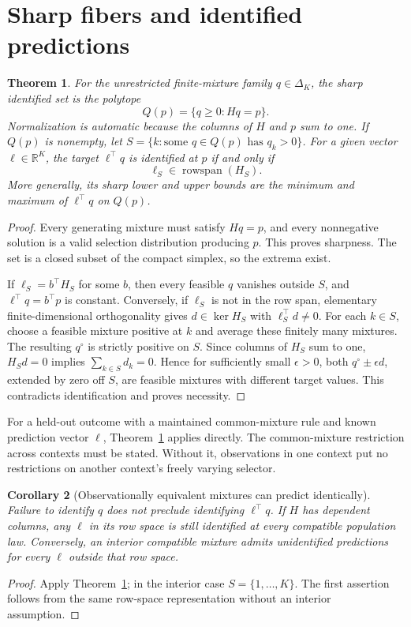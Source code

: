 \documentclass[11pt]{article}
\newtheorem{theorem}{Theorem}
\newtheorem{corollary}[theorem]{Corollary}
\theoremstyle{remark}
\newcommand{\R}{\mathbb R}
\begin{document}
\section{Sharp fibers and identified predictions}
\begin{theorem}\label{fiber}
For the unrestricted finite-mixture family $q\in\Delta_K$, the sharp identified set is the polytope
\[
 Q(p)=\{q\geq0:Hq=p\}.
\]
Normalization is automatic because the columns of $H$ and $p$ sum to one. If $Q(p)$ is nonempty, let
$S=\{k:\text{some }q\in Q(p)\text{ has }q_k>0\}$.
For a given vector $\ell\in\R^K$, the target $\ell^\top q$ is identified at $p$ if and only if
\[
 \ell_S\in\operatorname{rowspan}(H_S).
\]
More generally, its sharp lower and upper bounds are the minimum and maximum of $\ell^\top q$ on $Q(p)$.
\end{theorem}
\begin{proof}
Every generating mixture must satisfy $Hq=p$, and every nonnegative solution is a valid selection distribution producing $p$. This proves sharpness. The set is a closed subset of the compact simplex, so the extrema exist.

If $\ell_S=b^\top H_S$ for some $b$, then every feasible $q$ vanishes outside $S$, and $\ell^\top q=b^\top p$ is constant. Conversely, if $\ell_S$ is not in the row span, elementary finite-dimensional orthogonality gives $d\in\ker H_S$ with $\ell_S^\top d\ne0$. For each $k\in S$, choose a feasible mixture positive at $k$ and average these finitely many mixtures. The resulting $q^\circ$ is strictly positive on $S$. Since columns of $H_S$ sum to one, $H_Sd=0$ implies $\sum_{k\in S}d_k=0$. Hence for sufficiently small $\epsilon>0$, both $q^\circ\pm\epsilon d$, extended by zero off $S$, are feasible mixtures with different target values. This contradicts identification and proves necessity.
\end{proof}

For a held-out outcome with a maintained common-mixture rule and known prediction vector $\ell$, Theorem~\ref{fiber} applies directly. The common-mixture restriction across contexts must be stated. Without it, observations in one context put no restrictions on another context's freely varying selector.

\begin{corollary}[Observationally equivalent mixtures can predict identically]
Failure to identify $q$ does not preclude identifying $\ell^\top q$. If $H$ has dependent columns, any $\ell$ in its row space is still identified at every compatible population law. Conversely, an interior compatible mixture admits unidentified predictions for every $\ell$ outside that row space.
\end{corollary}
\begin{proof}
Apply Theorem~\ref{fiber}; in the interior case $S=\{1,\ldots,K\}$. The first assertion follows from the same row-space representation without an interior assumption.
\end{proof}
\end{document}
